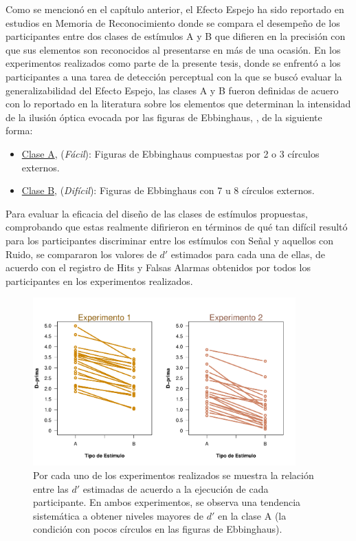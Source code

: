Como se mencionó en el capítulo anterior, el Efecto Espejo ha sido reportado en estudios en Memoria de Reconocimiento donde se compara el desempeño de los participantes entre dos clases de estímulos A y B que difieren en la precisión con que sus elementos son reconocidos al presentarse en más de una ocasión. En los experimentos realizados como parte de la presente tesis, donde se enfrentó a los participantes a una tarea de detección perceptual con la que se buscó evaluar la generalizabilidad del Efecto Espejo, las clases A y B fueron definidas de acuero con lo reportado en la literatura sobre los elementos que determinan la intensidad de la ilusión óptica evocada por las figuras de Ebbinghaus, \parencite{Massaro1971}, de la siguiente forma: \\

\begin{itemize}
\item \underline{Clase A}, (\textit{Fácil}): Figuras de Ebbinghaus compuestas por 2 o 3 círculos externos.\\

\item \underline{Clase B}, (\textit{Difícil}): Figuras de Ebbinghaus con 7 u 8 círculos externos.\\
\end{itemize}

Para evaluar la eficacia del diseño de las clases de estímulos propuestas, comprobando que estas realmente difirieron en términos de qué tan difícil resultó para los participantes discriminar entre los estímulos con Señal y aquellos con Ruido, se compararon los valores de $d'$ estimados para cada una de ellas, de acuerdo con el registro de Hits y Falsas Alarmas obtenidos por todos los participantes en los experimentos realizados.\\

\begin{figure}[th]
\centering
\includegraphics[width=0.90\textwidth]{Figures/Diff_D_E1yE2}
\caption[Diferencias entre las $d'$ de los niveles de dificultad propuestos]{Por cada uno de los experimentos realizados se muestra la relación entre las $d'$ estimadas de acuerdo a la ejecución de cada participante. En ambos experimentos, se observa una tendencia sistemática a obtener niveles mayores de $d'$ en la clase A (la condición con pocos círculos en las figuras de Ebbinghaus).}
\label{fig:Diff_D}
\end{figure}

